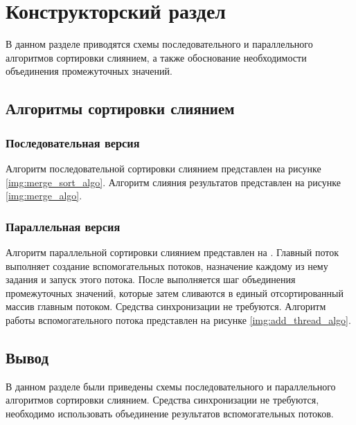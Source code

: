 \chapter{Конструкторский раздел}
В данном разделе приводятся схемы последовательного и параллельного алгоритмов сортировки слиянием, а также обоснование необходимости объединения промежуточных значений.

\section{Алгоритмы сортировки слиянием}
\subsection{Последовательная версия}
Алгоритм последовательной сортировки слиянием представлен на рисунке \ref{img:merge_sort_algo}.
\newpage
Алгоритм слияния результатов представлен на рисунке \ref{img:merge_algo}.
\subsection{Параллельная версия}
Алгоритм параллельной сортировки слиянием представлен на .
Главный поток выполняет создание вспомогательных потоков, назначение каждому из нему задания и запуск этого потока. После выполняется шаг объединения промежуточных значений, которые затем сливаются в единый отсортированный массив главным потоком. Средства синхронизации не требуются.  
\newpage
Алгоритм работы вспомогательного потока представлен на рисунке \ref{img:add_thread_algo}.

\section*{Вывод}
В данном разделе были приведены схемы последовательного и параллельного алгоритмов сортировки слиянием. Средства синхронизации не требуются, необходимо использовать объединение результатов вспомогательных потоков.
